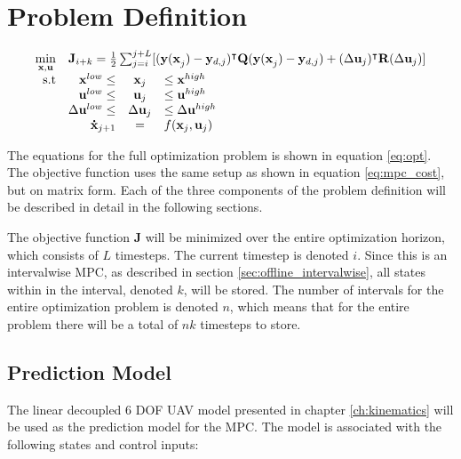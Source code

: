 \section{Problem Definition}

\begin{equation}
\label{eq:opt}
	\begin{array}{rrclcl}
		\displaystyle \min_{\mathbf{x}, \mathbf{u}} & \multicolumn{3}{l}{\mathbf{J}_{i+k} = \frac{1}{2} \sum_{j=i}^{j+L} [(\mathbf{y(\mathbf{x}}_j)-\mathbf{y}_{d,j})^\intercal \mathbf{Q}(\mathbf{y(\mathbf{x}}_j)-\mathbf{y}_{d,j}) + (\Delta\mathbf{u}_j)^\intercal \mathbf{R}(\Delta\mathbf{u}_j)]}\\
		\textrm{s.t}
		& \mathbf{x}^{low} \leq & \mathbf{x}_j & \leq \mathbf{x}^{high} \\
		& \mathbf{u}^{low} \leq & \mathbf{u}_j & \leq \mathbf{u}^{high} \\
		& \Delta\mathbf{u}^{low} \leq & \Delta\mathbf{u}_j & \leq \Delta\mathbf{u}^{high} \\
		&  \mathbf{\dot{x}}_{j+1} &= & f(\mathbf{x}_j,\mathbf{u}_j) 
	\end{array}
\end{equation}

The equations for the full optimization problem is shown in equation \ref{eq:opt}. The objective function uses the same setup as shown in equation \ref{eq:mpc_cost}, but on matrix form. Each of the three components of the problem definition will be described in detail in the following sections.

The objective function $\mathbf{J}$ will be minimized over the entire optimization horizon, which consists of $L$ timesteps. The current timestep is denoted $i$. Since this is an intervalwise MPC, as described in section \ref{sec:offline_intervalwise}, all states within in the interval, denoted $k$, will be stored. The number of intervals for the entire optimization problem is denoted $n$, which means that for the entire problem there will be a total of $nk$ timesteps to store. 


\subsection{Prediction Model}

The linear decoupled 6 DOF UAV model presented in chapter \ref{ch:kinematics} will be used as the prediction model for the MPC. The model is associated with the following states and control inputs:

